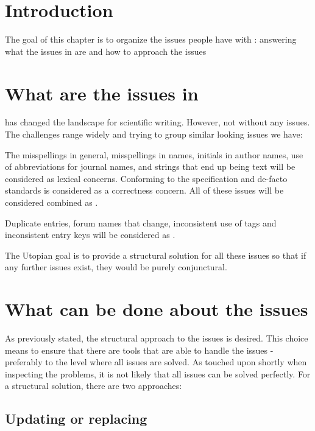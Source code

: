 \section{Introduction}

The goal of this chapter is to organize the issues people have with
{\bibtex}: answering what the issues in {\bibtex} are
 and how to approach the {\bibtex}
issues 


\section{What are the issues in {\bibtex}}
\label{sec:intro_what_issues}

{\bibtex} has changed the landscape for scientific writing.  However,
not without any issues.  The challenges range widely and trying to
group similar looking issues we have:

The misspellings in general, misspellings in names, initials in author
names, use of abbreviations for journal names, and {\bibtex} strings
that end up being text will be considered as lexical concerns.
Conforming to the specification and de-facto standards is considered
as a correctness concern.  All of these issues will be considered
combined as .

Duplicate entries, forum names that change, inconsistent use of tags
and inconsistent entry keys will be considered as .

The Utopian goal is to provide a structural solution for all these
issues so that if any further issues exist, they would be purely
conjunctural.


\section{What can be done about the {\bibtex} issues}
\label{sec:intro_what_to_do}

As previously stated, the structural approach to the issues is
desired.  This choice means to ensure that there are tools that are
able to handle the issues - preferably to the level where all issues
are solved.  As touched upon shortly when inspecting the problems, it
is not likely that all issues can be solved perfectly.  For a
structural solution, there are two approaches:


\subsection{Updating or replacing {\bibtex}}

